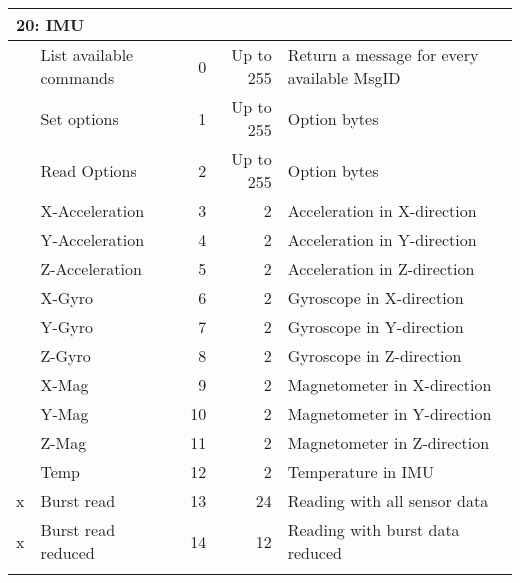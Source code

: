 \begin{table}[h]
\centering
	\begin{tabular}{llrrl}
	\toprule
	\multicolumn{5}{l}{\textbf{20: IMU}}\\
	\midrule
	& List available commands & 0 & Up to 255 & Return a message for every available MsgID\\
	& Set options & 1 & Up to 255 & Option bytes\\
	& Read Options & 2 & Up to 255 & Option bytes\\
	& X-Acceleration & 3 & 2 & Acceleration in X-direction\\
	& Y-Acceleration & 4 & 2 & Acceleration in Y-direction\\
	& Z-Acceleration & 5 & 2 & Acceleration in Z-direction\\
	& X-Gyro & 6 & 2 & Gyroscope in X-direction\\
	& Y-Gyro & 7 & 2 & Gyroscope in Y-direction\\
	& Z-Gyro & 8 & 2 & Gyroscope in Z-direction\\
	& X-Mag & 9 & 2 & Magnetometer in X-direction\\
	& Y-Mag & 10 & 2 & Magnetometer in Y-direction\\
	& Z-Mag & 11 & 2 & Magnetometer in Z-direction\\
	& Temp & 12 & 2 & Temperature in IMU\\
	x& Burst read & 13 & 24 & Reading with all sensor data\\
	x& Burst read reduced & 14 & 12 & Reading with burst data reduced\\
	\midrule
	\label{tab:commands}
	\end{tabular}
\end{table}
\newpage
